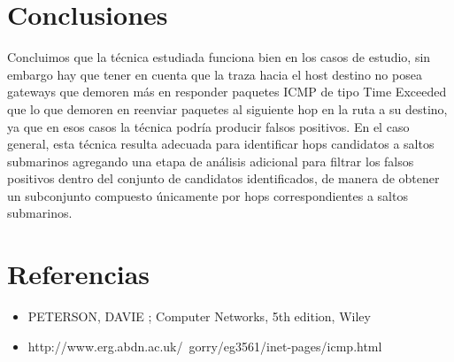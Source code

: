 \documentclass[10pt, a4paper]{article}
\begin{document}
\section{Conclusiones}

Concluimos que la técnica estudiada funciona bien en los casos de estudio, sin embargo hay que tener en cuenta que la traza hacia el host destino no posea gateways que demoren más en responder paquetes ICMP de tipo Time Exceeded que lo que demoren en reenviar paquetes al siguiente hop en la ruta a su destino, ya que en esos casos la técnica podría producir falsos positivos.
En el caso general, esta técnica resulta adecuada para identificar hops candidatos a saltos submarinos agregando una etapa de análisis adicional para filtrar los falsos positivos dentro del conjunto de candidatos identificados, de manera de obtener un subconjunto compuesto únicamente por hops correspondientes a saltos submarinos.

\section{Referencias}
\begin{itemize}
\item PETERSON, DAVIE ; Computer Networks, 5th edition, Wiley

\item http://www.erg.abdn.ac.uk/~gorry/eg3561/inet-pages/icmp.html
\end{itemize}
\end{document}
